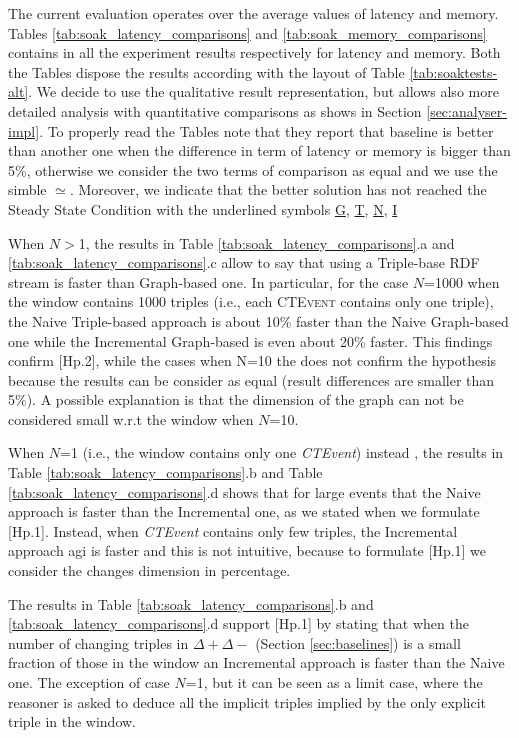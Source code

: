The current evaluation operates over the average values of latency and memory. Tables \ref{tab:soak_latency_comparisons} and \ref{tab:soak_memory_comparisons} contains in all the experiment results respectively for latency and memory.  Both the Tables dispose the results according with the layout of Table \ref{tab:soaktests-alt}. We decide to use the qualitative result representation, but \name allows also more detailed analysis with quantitative comparisons as shows in Section \ref{sec:analyser-impl}. To properly read the Tables note that they report that baseline is better than another one when the difference in term of latency or memory is bigger than 5\%, otherwise we consider the two terms of comparison as equal and we use the simble $\simeq$.
Moreover, we indicate that the better solution has not reached the Steady State Condition with the underlined symbols \underline{G}, \underline{T}, \underline{N}, \underline{I}


When $N>$1, the results in Table \ref{tab:soak_latency_comparisons}.a and \ref{tab:soak_latency_comparisons}.c allow to say that using a Triple-base RDF stream is faster than Graph-based one. In particular, for the case $N$=1000 when the window contains 1000 triples (i.e., each \textsc{CTEvent} contains only one triple),  the Naive Triple-based approach is about 10\% faster  than the Naive Graph-based one while the Incremental Graph-based is even about 20\% faster. This findings confirm [Hp.2], while the cases  when N=10 the does not confirm the hypothesis because the results can be consider as equal (result differences are smaller than 5\%). A possible explanation is that the dimension of the graph can not be considered small w.r.t the window when $N$=10.

When $N$=1 (i.e., the window contains only one \textit{CTEvent}) instead , the results in Table \ref{tab:soak_latency_comparisons}.b and Table \ref{tab:soak_latency_comparisons}.d shows that for large events that the Naive approach is faster than the Incremental one, as we stated when we formulate [Hp.1]. Instead, when \textit{CTEvent} contains only few triples, the Incremental approach agi is faster and this is not intuitive, because to formulate [Hp.1] we consider the changes dimension in percentage.

The results in Table \ref{tab:soak_latency_comparisons}.b and \ref{tab:soak_latency_comparisons}.d support [Hp.1] by stating that when the number of changing triples in $\Delta+ \Delta-$ (Section \ref{sec:baselines}) is a small fraction of those in the window an Incremental approach is faster than the Naive one. The exception of case $N$=1, but it can be seen as a limit case, where the reasoner is asked to deduce all the implicit triples implied by the only explicit triple in the window.  


